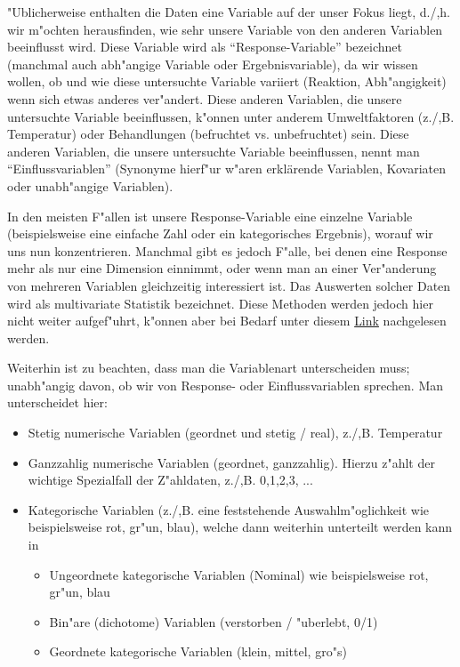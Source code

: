 \documentclass[a4paper,twoside]{tufte-book}\usepackage[]{graphicx}\usepackage[]{color}
\begin{document}
"Ublicherweise enthalten die Daten eine Variable auf der unser Fokus liegt, d./,h. wir m"ochten herausfinden, wie sehr unsere Variable von den anderen Variablen beeinflusst wird.   Diese Variable wird als ``Response-Variable'' bezeichnet (manchmal auch abh"angige Variable oder Ergebnisvariable), da wir wissen wollen, ob und wie diese untersuchte Variable variiert (Reaktion, Abh"angigkeit) wenn sich etwas anderes ver"andert. Diese anderen Variablen, die unsere untersuchte Variable beeinflussen, k"onnen unter anderem Umweltfaktoren (z./,B. Temperatur) oder Behandlungen (befruchtet vs. unbefruchtet) sein.  Diese anderen Variablen, die unsere untersuchte Variable beeinflussen, nennt man ``Einflussvariablen'' (Synonyme hierf"ur w"aren erklärende Variablen, Kovariaten oder unabh"angige Variablen). 

In den  meisten F"allen ist unsere Response-Variable eine einzelne Variable (beispielsweise eine einfache Zahl oder ein kategorisches Ergebnis), worauf wir uns nun konzentrieren. Manchmal gibt es jedoch F"alle, bei denen eine Response mehr als nur eine Dimension einnimmt, oder wenn man an einer Ver"anderung von mehreren Variablen gleichzeitig interessiert ist. Das Auswerten solcher Daten wird als multivariate Statistik bezeichnet. Diese Methoden werden jedoch hier nicht weiter aufgef"uhrt, k"onnen aber bei Bedarf unter diesem \href{http://biometry.github.io/APES/Stats/stats50-MultivariateStatistics.html}{Link} nachgelesen werden.

Weiterhin ist zu beachten, dass man die Variablenart unterscheiden muss; unabh"angig davon, ob wir von Response- oder Einflussvariablen sprechen. Man unterscheidet hier: 

\begin{itemize}
\item Stetig numerische Variablen (geordnet und stetig / real), z./,B. Temperatur
\item Ganzzahlig numerische Variablen (geordnet, ganzzahlig). Hierzu z"ahlt der wichtige Spezialfall der Z"ahldaten, z./,B. 0,1,2,3, ...
\item Kategorische Variablen (z./,B. eine feststehende Auswahlm"oglichkeit wie beispielsweise rot, gr"un, blau), welche dann weiterhin unterteilt werden kann in 
\begin{itemize}
\item Ungeordnete kategorische Variablen (Nominal) wie beispielsweise rot, gr"un, blau
\item Bin"are (dichotome) Variablen (verstorben / "uberlebt, 0/1)
\item Geordnete kategorische Variablen (klein, mittel, gro"s)
\end{itemize}
\end{itemize}
\end{document}
